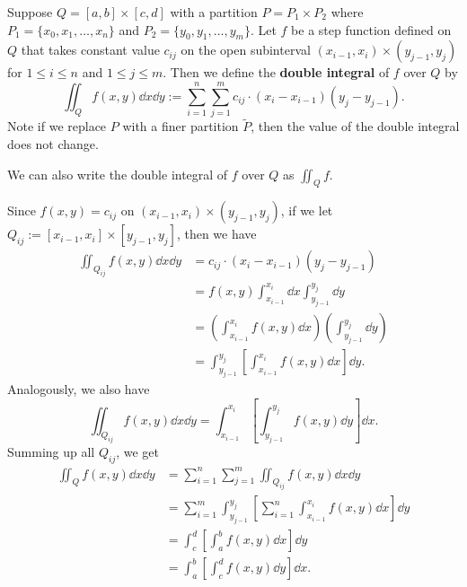\begin{definitionenv}
    Suppose $Q=[a,b]\times[c,d]$ with a partition $P=P_1 \times P_2$ where $P_1 = \{x_0, x_1, \dots, x_n\}$ and $P_2 = \{y_0, y_1, \dots, y_m\}$. Let $f$ be a step function defined on $Q$ that takes constant value $c_{ij}$ on the open subinterval $(x_{i-1},x_i)\times(y_{j-1},y_j)$ for $1 \leq i \leq n$ and $1 \leq j \leq m$. Then we define the \textbf{double integral} of $f$ over $Q$ by
    \[
        \iint_Q f(x,y) \dd x \dd y := \sum_{i=1}^n \sum_{j=1}^m c_{ij} \cdot (x_i - x_{i-1})(y_j - y_{j-1}).
    \]
    Note if we replace $P$ with a finer partition $\widetilde P$, then the value of the double integral does not change.
\end{definitionenv}
\begin{notationenv}
    We can also write the double integral of $f$ over $Q$ as $\displaystyle \iint_Q f$.
\end{notationenv}
\begin{remarkenv}
    Since $f(x,y) = c_{ij}$ on $(x_{i-1},x_i) \times (y_{j-1},y_j)$, if we let $Q_{ij} := [x_{i-1},x_i]\times[y_{j-1},y_j]$, then we have
    \[
    \begin{aligned}
        \iint_{Q_{ij}} f(x,y) \dd x \dd y &= c_{ij} \cdot (x_i - x_{i-1})(y_j - y_{j-1}) \\ &= f(x,y) \int_{x_{i-1}}^{x_i} \dd x \int_{y_{j-1}}^{y_j} \dd y\\ &= \left( \int_{x_{i-1}}^{x_i} f(x,y) \dd x \right) \left( \int_{y_{j-1}}^{y_j} \dd y  \right)\\ &= \int_{y_{j-1}}^{y_j} \left[ \int_{x_{i-1}}^{x_i} f(x,y) \dd x \right] \dd y.
    \end{aligned}
    \]
    Analogously, we also have
    \[
    \iint_{Q_{ij}} f(x,y) \dd x \dd y = \int_{x_{i-1}}^{x_i} \left[ \int_{y_{j-1}}^{y_j} f(x,y) \dd y \right] \dd x.
    \]
    Summing up all $Q_{ij}$, we get
    \[
    \begin{aligned}
        \iint_Q f(x,y) \dd x \dd y &= \sum_{i=1}^n \sum_{j=1}^m \iint_{Q_{ij}} f(x,y) \dd x \dd y\\ &= \sum_{i=1}^m \int_{y_{j-1}}^{y_j} \left[ \sum_{i=1}^n \int_{x_{i-1}}^{x_i} f(x,y) \dd x \right] \dd y\\ &= \int_c^d \left[ \int_a^b f(x,y) \dd x \right] \dd y\\ &= \int_a^b \left[ \int_c^d f(x,y) \dd y \right] \dd x.
    \end{aligned}
    \]
\end{remarkenv}
